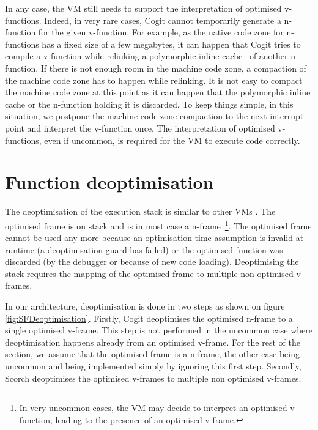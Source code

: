 \documentclass[a4paper,12pt,twoside]{../includes/ThesisStyle}
\begin{document}
In any case, the VM still needs to support the interpretation of optimised v-functions. Indeed, in very rare cases, Cogit cannot temporarily generate a n-function for the given v-function. For example, as the native code zone for n-functions has a fixed size of a few megabytes, it can happen that Cogit tries to compile a v-function while relinking a polymorphic inline cache~\cite{Holz91a} of another n-function. If there is not enough room in the machine code zone, a compaction of the machine code zone has to happen while relinking. It is not easy to compact the machine code zone at this point as it can happen that the polymorphic inline cache or the n-function holding it is discarded. To keep things simple, in this situation, we postpone the machine code zone compaction to the next interrupt point and interpret the v-function once. The interpretation of optimised v-functions, even if uncommon, is required for the VM to execute code correctly.  


\section {Function deoptimisation}
\label{sec:functionDeoptimisation}

The deoptimisation of the execution stack is similar to other VMs \cite{Fin03a, Holz92a}. The optimised frame is on stack and is in most case a n-frame~\footnote{In very uncommon cases, the VM may decide to interpret an optimised v-function, leading to the presence of an optimised v-frame.}. The optimised frame cannot be used any more because an optimisation time assumption is invalid at runtime (a deoptimisation guard has failed) or the optimised function was discarded (by the debugger or because of new code loading). Deoptimising the stack requires the mapping of the optimised frame to multiple non optimised v-frames. 

In our architecture, deoptimisation is done in two steps as shown on figure \ref{fig:SFDeoptimisation}. Firstly, Cogit deoptimises the optimised n-frame to a single optimised v-frame. This step is not performed in the uncommon case where deoptimisation happens already from an optimised v-frame. For the rest of the section, we assume that the optimised frame is a n-frame, the other case being uncommon and being implemented simply by ignoring this first step. Secondly, Scorch deoptimises the optimised v-frames to multiple non optimised v-frames.
\end{document}
